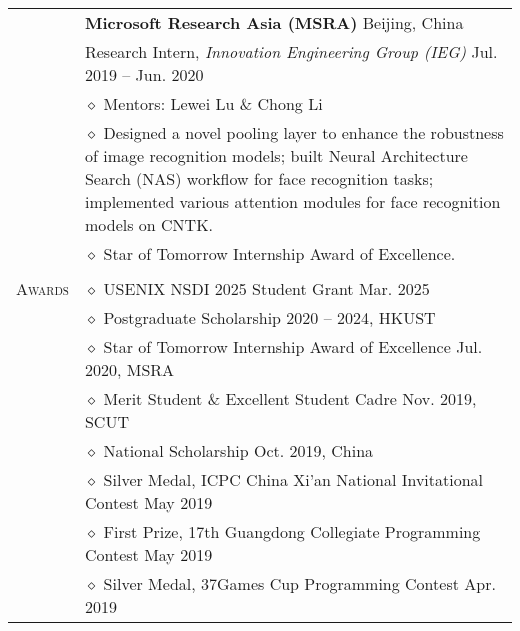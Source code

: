 \documentclass[letterpaper, 12pt]{article}
\begin{document}
\begin{longtable}{p{1.0in}p{5.8in}}
\\

& {\textbf{Microsoft Research Asia (MSRA)}} \hfill Beijing, China\\
& Research Intern, \textit{Innovation Engineering Group (IEG)} \hfill Jul. 2019 -- Jun. 2020 \\
    & $\diamond$ Mentors: Lewei Lu \& Chong Li \\
    & $\diamond$ Designed a novel pooling layer to enhance the robustness of image recognition models; built Neural Architecture Search (NAS) workflow for face recognition tasks; implemented various attention modules for face recognition models on CNTK. \\
    & $\diamond$ Star of Tomorrow Internship Award of Excellence. \\

& \\


\nohyphens{\textsc{Awards}}
& $\diamond$ USENIX NSDI 2025 Student Grant \hfill Mar. 2025 \\

& $\diamond$ Postgraduate Scholarship \hfill 2020 -- 2024, HKUST \\
& $\diamond$ Star of Tomorrow Internship Award of Excellence \hfill Jul. 2020, MSRA \\

& $\diamond$ Merit Student \& Excellent Student Cadre \hfill Nov. 2019, SCUT \\
& $\diamond$ National Scholarship \hfill Oct. 2019, China \\

& $\diamond$ Silver Medal, ICPC China Xi'an National Invitational Contest \hfill May 2019 \\

& $\diamond$ First Prize, 17th Guangdong Collegiate Programming Contest \hfill May 2019 \\

& $\diamond$ Silver Medal, 37Games Cup Programming Contest \hfill Apr. 2019 \\


\end{longtable}
\end{document}

